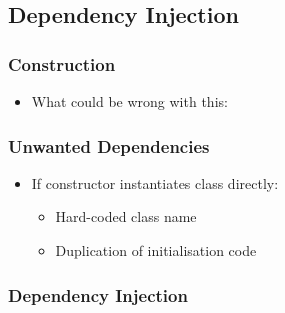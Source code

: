 \subsection{Dependency Injection}\label{dependency-injection}

\subsubsection{Construction}\label{construction}

\begin{itemize}
\itemsep1pt\parskip0pt
\item
  What could be wrong with this:
\end{itemize}

\begin{Shaded}
\begin{Highlighting}[]

 
\NormalTok{\};}

 
\NormalTok{:}
  \NormalTok{\{}
     
  \NormalTok{\}}

\NormalTok{:}
\NormalTok{\};}

 
\NormalTok{\{}
\NormalTok{\}}

\end{Highlighting}
\end{Shaded}

\subsubsection{Unwanted Dependencies}\label{unwanted-dependencies}

\begin{itemize}
\itemsep1pt\parskip0pt
\item
  If constructor instantiates class directly:

  \begin{itemize}
  \itemsep1pt\parskip0pt
  \item
    Hard-coded class name
  \item
    Duplication of initialisation code
  \end{itemize}
\end{itemize}

\subsubsection{Dependency Injection}\label{dependency-injection-1}

